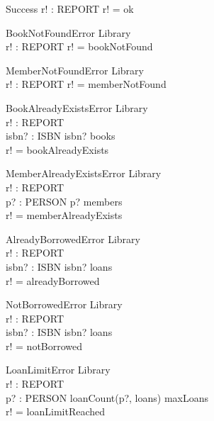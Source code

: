 \documentclass{article}
\begin{document}

\begin{schema}{Success}
  r! : REPORT
\where
  r! = ok
\end{schema}

\begin{schema}{BookNotFoundError}
  \Xi Library \\
  r! : REPORT
\where
  r! = bookNotFound
\end{schema}

\begin{schema}{MemberNotFoundError}
  \Xi Library \\
  r! : REPORT
\where
  r! = memberNotFound
\end{schema}

\begin{schema}{BookAlreadyExistsError}
  \Xi Library \\
  r! : REPORT \\
  isbn? : ISBN
\where
  isbn? \in books \\
  r! = bookAlreadyExists
\end{schema}

\begin{schema}{MemberAlreadyExistsError}
  \Xi Library \\
  r! : REPORT \\
  p? : PERSON
\where
  p? \in members \\
  r! = memberAlreadyExists
\end{schema}

\begin{schema}{AlreadyBorrowedError}
  \Xi Library \\
  r! : REPORT \\
  isbn? : ISBN
\where
  isbn? \in \dom loans \\
  r! = alreadyBorrowed
\end{schema}

\begin{schema}{NotBorrowedError}
  \Xi Library \\
  r! : REPORT \\
  isbn? : ISBN
\where
  isbn? \notin \dom loans \\
  r! = notBorrowed
\end{schema}

\begin{schema}{LoanLimitError}
  \Xi Library \\
  r! : REPORT \\
  p? : PERSON
\where
  loanCount(p?, loans) \geq maxLoans \\
  r! = loanLimitReached
\end{schema}
\end{document}
